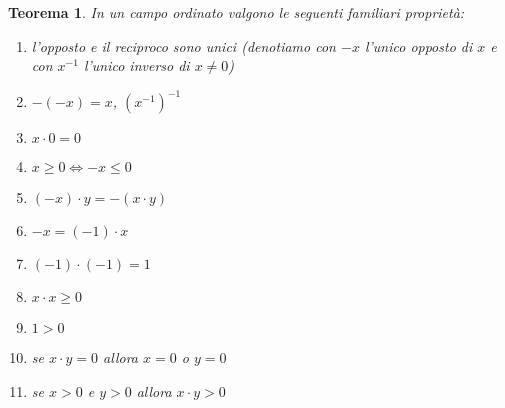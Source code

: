 \documentclass[italian,a4paper,oneside,headinclude]{scrbook}
\newcommand{\enclose}[1]{{\left( #1 \right)}}
\newtheorem{theorem}{Teorema}
\begin{document}
\begin{theorem}
In un campo ordinato valgono le seguenti
familiari proprietà:
\begin{enumerate}
  \item l'opposto e il reciproco sono unici (denotiamo con $-x$ l'unico opposto di $x$ e con $x^{-1}$ l'unico inverso di $x\neq 0$)
  \item $-(-x) = x$, $\enclose{x^{-1}}^{-1}$
  \item $x \cdot 0 = 0$
  \item $x\ge 0 \iff -x \le 0$
  \item $(-x)\cdot y = -(x\cdot y)$
  \item $-x = (-1)\cdot x$
  \item $(-1)\cdot(-1) = 1$
  \item $x\cdot x \ge 0$
  \item $1 > 0$
  \item se $x\cdot y = 0$ allora $x = 0$ o $y = 0$
  \item se $x>0$ e $y>0$  allora $x\cdot y > 0$
\end{enumerate}
\end{theorem}
%
\end{document}
